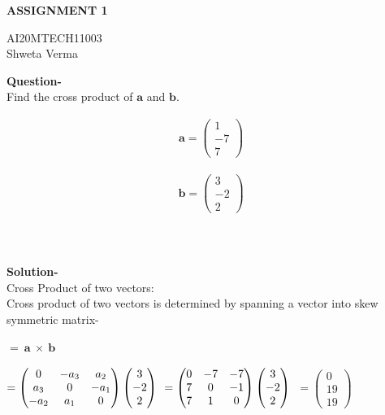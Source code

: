 \documentclass[11pt]{article}
\newcommand{\myvec}[1]{\ensuremath{\begin{pmatrix}#1\end{pmatrix}}}
\renewcommand{\vec}[1]{\boldsymbol{#1}}
\begin{document}
\begin{center}
\huge\textbf{ASSIGNMENT 1} 

\Large AI20MTECH11003
\\
\large Shweta Verma
\\

\end{center}
\large\textbf{Question-} 
\\
Find the cross product of $\boldsymbol{a}$ and $\boldsymbol{b}$.


\begin{align*}
\vec{a} = \myvec{1\\-7\\7}
\end{align*}


\begin{align*}
\vec{b} = \myvec{3\\-2\\2}
\end{align*}
\\
\\
\\
\large\textbf{Solution-}
\\
Cross Product of two vectors: 
\\
Cross product of two vectors is determined by spanning a vector into skew symmetric matrix-
\\
\\
$\boldsymbol{ = ~a ~\times~ b}$
\\
\\
$
=\myvec
   {0 & -a_3 & a_2\\
   a_3 & 0 & -a_1\\
   -a_2 & a_1 & 0\\}
  \myvec{3\\-2\\2}
\\
\\
\\
$
$
= \myvec
  {0 & -7 & -7\\
  7 & 0 & -1\\
  7 & 1 & 0\\}
 \myvec{3\\-2\\2}
\\
\\
\\
$
$
=\myvec{0\\19\\19}
$
\end{document}
